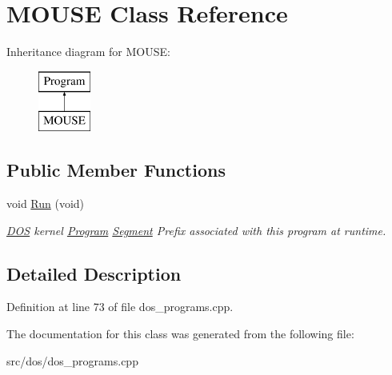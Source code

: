 \hypertarget{classMOUSE}{\section{M\-O\-U\-S\-E Class Reference}
\label{classMOUSE}
}
Inheritance diagram for M\-O\-U\-S\-E\-:\begin{figure}[H]
\begin{center}
\leavevmode
\includegraphics[height=2.000000cm]{classMOUSE}
\end{center}
\end{figure}
\subsection*{Public Member Functions}
\begin{DoxyCompactItemize}
\item 
\hypertarget{classMOUSE_a534674c1b95232e1fa0a0ec93bcbd698}{void \hyperlink{classMOUSE_a534674c1b95232e1fa0a0ec93bcbd698}{Run} (void)}\label{classMOUSE_a534674c1b95232e1fa0a0ec93bcbd698}

\begin{DoxyCompactList}\small\item\em \hyperlink{classDOS}{D\-O\-S} kernel \hyperlink{classProgram}{Program} \hyperlink{structSegment}{Segment} Prefix associated with this program at runtime. \end{DoxyCompactList}\end{DoxyCompactItemize}


\subsection{Detailed Description}


Definition at line 73 of file dos\-\_\-programs.\-cpp.



The documentation for this class was generated from the following file\-:\begin{DoxyCompactItemize}
\item 
src/dos/dos\-\_\-programs.\-cpp\end{DoxyCompactItemize}
